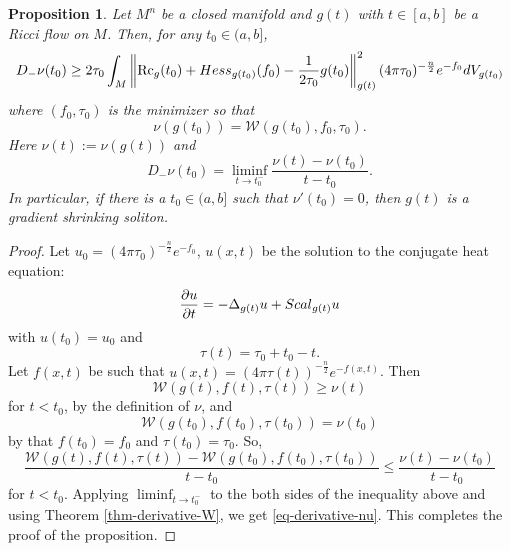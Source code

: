 \documentclass[10pt,a4paper]{amsart}
\newtheorem{prop}{Proposition}
\def\Hess{{\rm Hess}}
\def\Rc{\mbox{Rc}}
\def\Scal{{\rm Scal}}
\def\W{{\mathcal W}}
\def\p{\partial}
\begin{document}
\begin{prop}\label{prop-derivative-nu}
Let $M^n$ be a closed manifold and $g(t)$ with $t\in [a,b]$ be a Ricci flow on $M$. Then, for any $t_0\in (a,b]$, 
\begin{equation}\label{eq-derivative-nu}
D_-\nu(t_0)\geq 2\tau_0\int_M\left\|\Rc_g(t_0)+\Hess_{g(t_0)}(f_0)-\frac{1}{2\tau_0}g(t_0)\right\|_{g(t)}^2(4\pi \tau_0)^{-\frac{n}{2}}e^{-f_0}dV_{g(t_0)}
\end{equation}
where $(f_0,\tau_0)$ is the minimizer so that 
$$\nu(g(t_0))=\W(g(t_0),f_0,\tau_0).$$
Here $\nu(t):=\nu(g(t))$ and 
$$D_-\nu(t_0)=\liminf_{t\to t_0^-}\frac{\nu(t)-\nu(t_0)}{t-t_0}.$$
In particular, if there is a $t_0\in (a,b]$ such that $\nu'(t_0)=0$, then $g(t)$ is a gradient shrinking soliton. 
\end{prop}

\begin{proof}
Let $u_0=(4\pi \tau_0)^{-\frac{n}{2}}e^{-f_0}$, $u(x,t)$ be the solution to the conjugate heat equation:
$$\frac{\p u}{\p t}=-\Delta_{g(t)} u+\Scal_{g(t)} u$$
with $u(t_0)=u_0$ and $$\tau(t)=\tau_0+t_0-t.$$
Let $f(x,t)$ be such that $u(x,t)=(4\pi \tau(t))^{-\frac{n}{2}}e^{-f(x,t)}$. Then
$$\W(g(t),f(t),\tau(t))\geq\nu(t)$$
for $t<t_0$, by the definition of $\nu$, and 
$$\W(g(t_0),f(t_0),\tau(t_0))=\nu(t_0)$$
by that $f(t_0)=f_0$ and $\tau(t_0)=\tau_0$. So, 
$$\frac{\W(g(t),f(t),\tau(t))-\W(g(t_0),f(t_0),\tau(t_0))}{t-t_0}\leq \frac{\nu(t)-\nu(t_0)}{t-t_0}$$
for $t<t_0$. Applying $\displaystyle\liminf_{t\to t_0^-}$ to the both sides of the inequality above and using Theorem \ref{thm-derivative-W}, we get \eqref{eq-derivative-nu}. This completes the proof of the proposition.
\end{proof}
\end{document}

